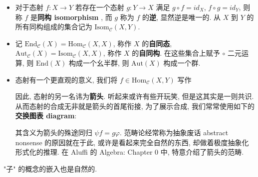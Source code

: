 \documentclass[UTF8]{book}
\begin{document}
\begin{definition}
\begin{itemize}
        \item 对于态射 $f:X\to Y$ 若存在一个态射 $g:Y\to X$ 
        满足 $g\circ f = id_X$, $f\circ g = id_Y$, 
        则称 $f$ 是\textbf{同构 isomorphism} , 
        而 $g$ 称为 $f$ 的\textbf{逆}, 显然逆是唯一的. 
        从 $X$ 到 $Y$ 的所有同构组成的集合记为 
        $\mathrm{Isom}_{\mathcal{C}}(X,Y)$. 
        
        \item 记 
        $\mathrm{End}_{\mathcal{C}}(X) = \mathrm{Hom}_{\mathcal{C}}(X,X)$, 
        称作 $X$ 的\textbf{自同态}, 
        $\mathrm{Aut}_{\mathcal{C}}(X) = \mathrm{Isom}_{\mathcal{C}}(X,X)$, 
        称作 $X$ 的\textbf{自同构}. 
        在这些集合上赋予 $\circ$ 二元运算, 
        则 $\mathrm{End}(X)$ 构成一个幺半群, 
        则 $\mathrm{Aut}(X)$ 构成一个群. 

        \item 态射有一个更直观的意义, 我们将 
        $f \in \mathrm{Hom}_{\mathcal{C}}(X,Y)$ 写作 
        因此, 态射的另一名讳为\textbf{箭头}. 
        听起来或许有些开玩笑, 但是这其实是一则共识. 
        从而态射的合成无非就是箭头的首尾衔接, 为了展示合成, 
        我们常常使用如下的\textbf{交换图表 diagram}: 
        \begin{center}
        \end{center}
        其含义为箭头的殊途同归 $\psi f = g \varphi$. 
        范畴论经常称为抽象废话 abstract nonsense 的原因就在于此, 
        或许是看起来完全自然的东西, 却做着极度抽象化形式化的推理. 
        在 Aluffi 的 Algebra: Chapter 0 中, 特意介绍了箭头的范畴. 
    \end{itemize}
\end{definition}

"子" 的概念的嵌入也是自然的. 
\end{document}
